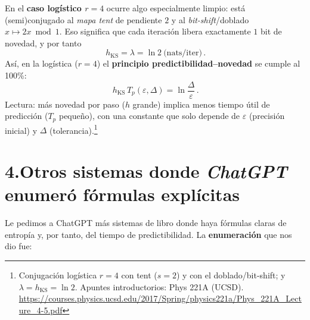 \documentclass[11pt,a4paper]{article}
\begin{document}
En el \textbf{caso logístico $r=4$} ocurre algo especialmente limpio: está (semi)conjugado al \emph{mapa tent} de pendiente $2$ y al \emph{bit-shift}/doblado $x\mapsto 2x \bmod 1$. Eso significa que cada iteración libera exactamente $1$ bit de novedad, y por tanto
\[
\boxed{\,h_{\mathrm{KS}}=\lambda=\ln 2\ \text{(nats/iter)}\,}.
\]
Así, en la logística ($r=4$) el \textbf{principio predictibilidad--novedad} se cumple al 100\%:
\[
\boxed{\,h_{\mathrm{KS}}\,T_p(\varepsilon,\Delta)=\ln\!\frac{\Delta}{\varepsilon}\,}.
\]
Lectura: más novedad por paso ($h$ grande) implica menos tiempo útil de predicción ($T_p$ pequeño), con una constante que solo depende de $\varepsilon$ (precisión inicial) y $\Delta$ (tolerancia).\footnote{Conjugación logística $r=4$ con tent ($s=2$) y con el doblado/bit-shift; y $\lambda=h_{\mathrm{KS}}=\ln 2$. Apuntes introductorios: Phys 221A (UCSD). \url{https://courses.physics.ucsd.edu/2017/Spring/physics221a/Phys_221A_Lecture_4-5.pdf}}

\section*{4.\;Otros sistemas donde \emph{ChatGPT} enumeró fórmulas explícitas}
Le pedimos a ChatGPT más sistemas de libro donde haya fórmulas claras de entropía y, por tanto, del tiempo de predictibilidad. La \textbf{enumeración} que nos dio fue:
\end{document}
